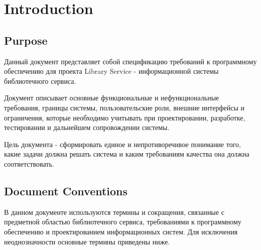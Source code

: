 \documentclass[12pt,a4paper]{article}
\begin{document}
	\section{Introduction}
	
	\subsection{Purpose}
	
	Данный документ представляет собой спецификацию требований к программному
	обеспечению для проекта Library Service - информационной системы библиотечного
	сервиса.
	
	Документ описывает основные функциональные и нефункциональные требования,
	границы системы, пользовательские роли, внешние интерфейсы и ограничения,
	которые необходимо учитывать при проектировании, разработке, тестировании и
	дальнейшем сопровождении системы.
	
	Цель документа - сформировать единое и непротиворечивое понимание того, какие
	задачи должна решать система и каким требованиям качества она должна
	соответствовать.
	
	\subsection{Document Conventions}
	
	В данном документе используются термины и сокращения, связанные с предметной
	областью библиотечного сервиса, требованиями к программному обеспечению и
	проектированием информационных систем. Для исключения неоднозначности основные
	термины приведены ниже.
	
\end{document}

